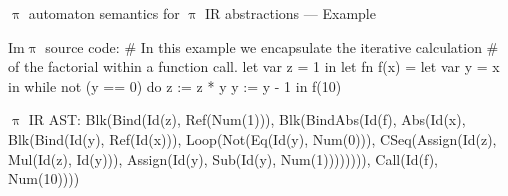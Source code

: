 \documentclass{beamer}
\begin{document}

\begin{frame}{{\color{red}$\uppi$ automaton} semantics for {\color{red}$\uppi$ IR} abstractions --- Example}
\begin{imp}
Im$\uppi$ source code:
# In this example we encapsulate the iterative calculation
# of the factorial within a function call.
let var z = 1
in
    let fn f(x) =
        let var y = x
        in
            while not (y == 0)
            do
                z := z * y
                y := y - 1
    in f(10)
\end{imp}
    
 \framebreak   

\begin{piIR}
$\uppi$ IR AST: 
Blk(Bind(Id(z), Ref(Num(1))), 
	Blk(BindAbs(Id(f), Abs(Id(x), 
		Blk(Bind(Id(y), Ref(Id(x))), 
			Loop(Not(Eq(Id(y), Num(0))), 
				CSeq(Assign(Id(z), Mul(Id(z), Id(y))), 
						Assign(Id(y), Sub(Id(y), Num(1)))))))), 
		Call(Id(f), Num(10))))
\end{piIR}
\end{frame}

\end{document}
